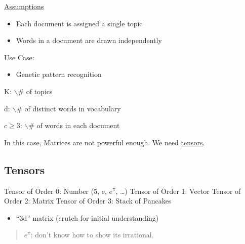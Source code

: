 \documentclass[11pt]{article}
\begin{document}
\uline{Assumptions}

\begin{itemize}
\item Each document is assigned a single topic
\item Words in a document are drawn independently
\end{itemize}

Use Case:
\begin{itemize}
\item Genetic pattern recognition
\end{itemize}

K: $\backslash$# of topics

d: $\backslash$# of distinct words in vocabulary

\(c \geq 3\): $\backslash$# of words in each document

In this case, Matrices are not powerful enough. We need \uline{tensors}.
\subsection{Tensors}
\label{sec:org2597fe7}


Tensor of Order 0: Number (5, e, \(e^\pi\), \ldots{})
Tensor of Order 1: Vector
Tensor of Order 2: Matrix
Tensor of Order 3: Stack of Pancakes
\begin{itemize}
\item ``3d'' matrix (crutch for initial understanding)
\end{itemize}

\begin{quote}
\(e^\pi\): don't know how to show its irrational.
\end{quote}
\end{document}
